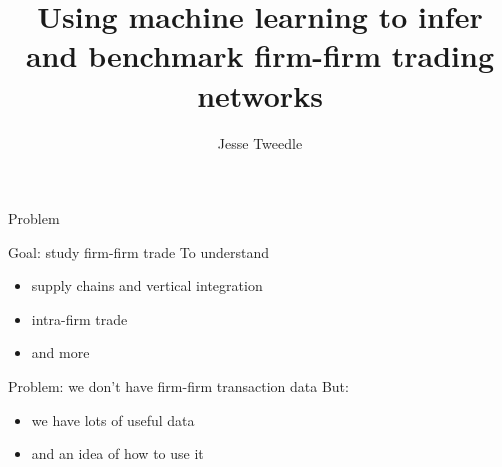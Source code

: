 \documentclass[12pt]{beamer}
\begin{document}
\title{Using machine learning to infer and benchmark firm-firm trading networks}
\author{Jesse Tweedle}

\begin{frame}{}

\maketitle

\end{frame}


\begin{frame}{Problem}

\begin{block}{Goal: study firm-firm trade}
To understand
\begin{itemize}
\item supply chains and vertical integration
\item intra-firm trade
\item and more
\end{itemize}
\end{block}

\begin{block}{Problem: we don't have firm-firm transaction data}
But: 
\begin{itemize}
\item we have lots of useful data
\item and an idea of how to use it
\end{itemize}
\end{block}


\end{frame}
\end{document}
